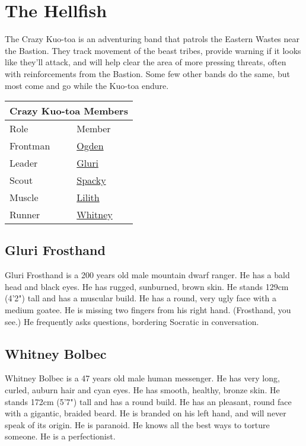 \section{The Hellfish}

The Crazy Kuo-toa is an adventuring band that patrols the Eastern Wastes near the Bastion.
They track movement of the beast tribes, provide warning if it looks like they'll attack, and will
  help clear the area of more pressing threats, often with reinforcements from the Bastion.
Some few other bands do the same, but most come and go while the Kuo-toa endure.

\bigskip
\begin{center}
\begin{tabular}{|l|l|}
\hline
\multicolumn{2}{|c|}{Crazy Kuo-toa Members}\\
\hline
Role & Member \\
\hline
Frontman & \hyperref[subsec:ogden]{Ogden} \\
Leader & \hyperref[subsec:gluri]{Gluri} \\
Scout & \hyperref[subsec:spacky]{Spacky} \\
Muscle & \hyperref[subsec:alotel]{Lilith} \\
Runner & \hyperref[subsec:whitney]{Whitney} \\
\hline
\end{tabular}
\end{center}

\subsection{Gluri Frosthand}\label{subsec:gluri}

Gluri Frosthand is a 200 years old male mountain dwarf ranger.
He has a bald head and black eyes.
He has rugged, sunburned, brown skin.
He stands 129cm (4'2") tall and has a muscular build.
He has a round, very ugly face with a medium goatee.
He is missing two fingers from his right hand.
(Frosthand, you see.)
He frequently asks questions, bordering Socratic in conversation.

\subsection{Whitney Bolbec}\label{subsec:whitney}

Whitney Bolbec is a 47 years old male human messenger.
He has very long, curled, auburn hair and cyan eyes.
He has smooth, healthy, bronze skin.
He stands 172cm (5'7") tall and has a round build.
He has an pleasant, round face with a gigantic, braided beard.
He is branded on his left hand, and will never speak of its origin.
He is paranoid.
He knows all the best ways to torture someone.
He is a perfectionist.
